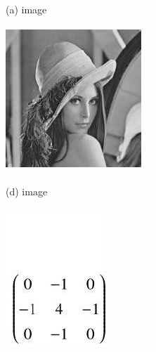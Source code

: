 \documentclass[10pt]{article}
\begin{document}
(a) image

\includegraphics[max width=\textwidth]{2022_01_06_b5ce182ed1bd5f482e5bg-12(1)}

(d) image

\includegraphics[max width=\textwidth]{2022_01_06_b5ce182ed1bd5f482e5bg-12(2)}
\end{document}
